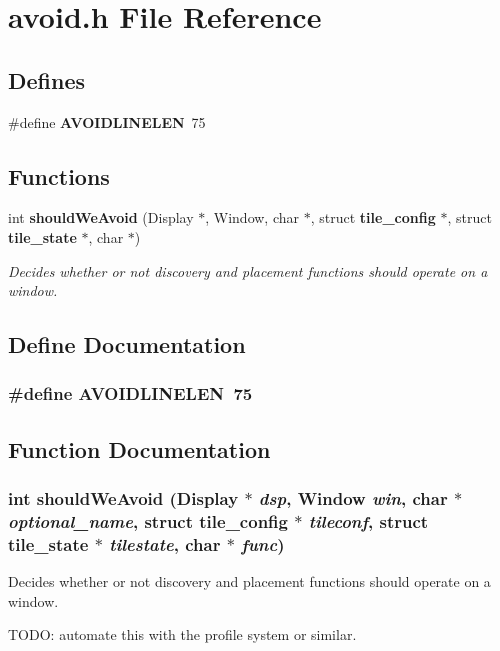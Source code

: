 \section{avoid.h File Reference}
\label{avoid_8h}
\subsection*{Defines}
\begin{CompactItemize}
\item 
\#define {\bf AVOIDLINELEN}~75
\end{CompactItemize}
\subsection*{Functions}
\begin{CompactItemize}
\item 
int {\bf should\-We\-Avoid} (Display $\ast$, Window, char $\ast$, struct {\bf tile\_\-config} $\ast$, struct {\bf tile\_\-state} $\ast$, char $\ast$)
\begin{CompactList}\small\item\em Decides whether or not discovery and placement functions should operate on a window. \item\end{CompactList}\end{CompactItemize}


\subsection{Define Documentation}
\subsubsection{\setlength{\rightskip}{0pt plus 5cm}\#define AVOIDLINELEN~75}\label{avoid_8h_a0}




\subsection{Function Documentation}
\subsubsection{\setlength{\rightskip}{0pt plus 5cm}int should\-We\-Avoid (Display $\ast$ {\em dsp}, Window {\em win}, char $\ast$ {\em optional\_\-name}, struct {\bf tile\_\-config} $\ast$ {\em tileconf}, struct {\bf tile\_\-state} $\ast$ {\em tilestate}, char $\ast$ {\em func})}\label{avoid_8h_a1}


Decides whether or not discovery and placement functions should operate on a window. 

TODO: automate this with the profile system or similar. 